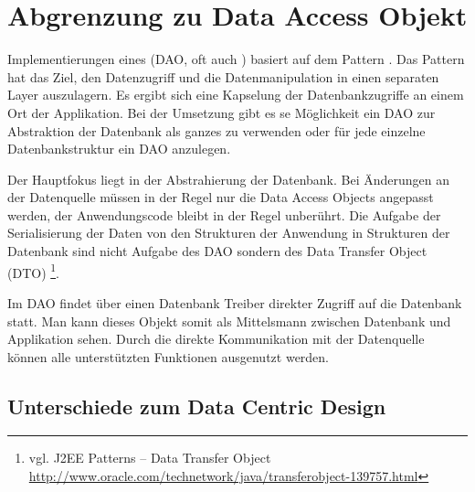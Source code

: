 \section{Abgrenzung zu Data Access Objekt}
Implementierungen eines  (DAO, oft auch ) basiert auf dem  Pattern \cite{j2ee-pattern}.  Das Pattern hat das Ziel, den Datenzugriff und die Datenmanipulation in einen separaten Layer auszulagern. Es ergibt sich eine Kapselung der Datenbankzugriffe an einem Ort der Applikation. Bei der Umsetzung gibt es se Möglichkeit ein DAO zur Abstraktion der Datenbank als ganzes zu verwenden oder für jede einzelne Datenbankstruktur ein DAO anzulegen.

Der Hauptfokus liegt in der Abstrahierung der Datenbank. Bei Änderungen an der Datenquelle müssen in der Regel nur die Data Access Objects angepasst werden, der Anwendungscode bleibt in der Regel unberührt. Die Aufgabe der Serialisierung der Daten von den Strukturen der Anwendung in Strukturen der Datenbank sind nicht Aufgabe des DAO sondern des Data Transfer Object (DTO) \footnote{vgl. J2EE Patterns – Data Transfer Object \url{http://www.oracle.com/technetwork/java/transferobject-139757.html}}.

Im DAO findet über einen Datenbank Treiber direkter Zugriff auf die Datenbank statt. Man kann dieses Objekt somit als Mittelsmann zwischen Datenbank und Applikation sehen. Durch die direkte Kommunikation mit der Datenquelle können alle unterstützten Funktionen ausgenutzt werden. 

\subsection{Unterschiede zum Data Centric Design}


